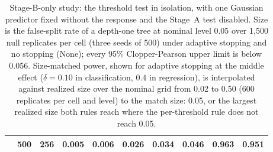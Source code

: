 \begin{table}[!htbp]
\begin{tabular}{@{}lrrrrrrrrr@{}}
     & 500 & 256 & 0.005 & 0.006 & 0.026 & 0.034 & 0.046 & 0.963 & 0.951 \\
    \bottomrule
  \end{tabular}
  \caption{Stage-B-only study: the threshold test in isolation, with one
  Gaussian predictor fixed without the response and the Stage~A test disabled.
  Size is the false-split rate of a depth-one tree at nominal level 0.05 over
  1,500 null replicates per cell (three seeds of 500) under adaptive stopping
  and no stopping (None); every 95\% Clopper-Pearson upper limit is below
  0.056. Size-matched power, shown for adaptive stopping at the middle effect
  ($\delta = 0.10$ in classification, $0.4$ in regression), is interpolated
  against realized size over the nominal grid from 0.02 to 0.50 (600 replicates
  per cell and level) to the match size: 0.05, or the largest realized size
  both rules reach where the per-threshold rule does not reach 0.05.}
  \label{tab:stageB-only-full}
\end{table}

